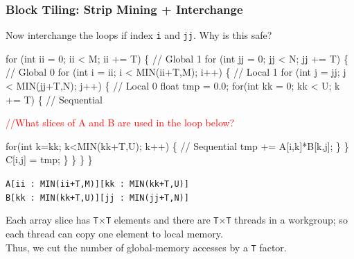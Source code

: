 \documentclass{beamer}
\newcommand{\red}[1]{\textcolor{Red}{{#1}}}
\renewcommand{\emph}[1]{\textcolor{CosGreen}{ #1}}
\newcommand{\emp}[1]{\textcolor{DikuRed}{ #1}}
\newcommand{\emphh}[1]{\textcolor{CosGreen}{ #1}}
\begin{document}
\begin{frame}[fragile,t]
  \frametitle{Block Tiling: Strip Mining + Interchange}

\emph{Now interchange the loops if index {\tt i} and {\tt jj}.} Why is this safe?\smallskip

\begin{colorcode}[fontsize=\scriptsize]
for (int ii = 0; ii < M; ii += T) \{             \emp{// Global 1}
  for (int jj = 0; jj < N; jj += T) \{           \emp{// Global 0}
    for (int i = ii; i < MIN(ii+T,M); i++) \{    \emphh{// Local 1}
      for (int j = jj; j < MIN(jj+T,N); j++) \{  \emphh{// Local 0}
          float tmp = 0.0;
          for(int kk = 0; kk < U; k += T) \{     \emp{// Sequential}

            \red{//What slices of A and B are used in the loop below?}

            for(int k=kk; k<MIN(kk+T,U); k++) \{ \emp{// Sequential}
                tmp += A[i,k]*B[k,j];
            \}
          \}
          C[i,j] = tmp;          
\} \} \} \}
\end{colorcode}

\pause

\emph{\tt A[ii : MIN(ii+T,M)][kk : MIN(kk+T,U)]}\\
\emph{\tt B[kk : MIN(kk+T,U)][jj : MIN(jj+T,N)]}\\\smallskip

Each array slice has {\tt T$\times$T} elements and there are {\tt T$\times$T} threads in a workgroup;
so each thread can copy one element to local memory.\\  
Thus, we cut the number of global-memory accesses by a {\tt T} factor.

\end{frame}
\end{document}
